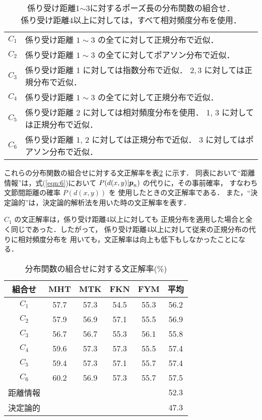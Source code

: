 \begin{table}
\begin{center}
\caption{係り受け距離1$\sim$3に対するポーズ長の分布関数の組合せ．\\
係り受け距離4以上に対しては，すべて相対頻度分布を使用．}
\label{cond:2}
\small
\begin{tabular}{cl}
\hline
\hline
$C_1$& 係り受け距離 $1\sim3$ の全てに対して正規分布で近似．\\
$C_2$& 係り受け距離 $1\sim3$ の全てに対してポアソン分布で近似．\\
$C_3$& 係り受け距離 1 に対しては指数分布で近似．
 $2, 3$ に対しては正規分布で近似．\\
\hline
$C_4$& 係り受け距離 $1\sim3$ の全てに対して正規分布で近似．\\
$C_5$& 係り受け距離 2 に対しては相対頻度分布を使用．
 1, 3 に対しては正規分布で近似．\\
$C_6$& 係り受け距離 1, 2 に対しては正規分布で近似．
 3 に対してはポアソン分布で近似．\\
\hline
\hline
\end{tabular}
\normalsize
\end{center}
\end{table}


これらの分布関数の組合せに対する文正解率を表\ref{res:3} に示す．
同表において``距離情報''は，式(\ref{eqn:6})において
$P(d(x,y)|\mbox{\boldmath$p$}_n)$ の代りに，その事前確率，
すなわち文節間距離の確率 $P(d(x,y))$ を
使用したときの文正解率である．
また，``決定論的''は，決定論的解析法を用いた時の文正解率を表す．

$C_{1}$ の文正解率は，係り受け距離4以上に対しても
正規分布を適用した場合と全く同じであった．したがって，
係り受け距離4以上に対して従来の正規分布の代りに相対頻度分布を
用いても，文正解率は向上も低下もしなかったことになる．

\begin{table}[htbp]
\begin{center}
\caption{分布関数の組合せに対する文正解率(\%)}
\label{res:3}
\small
\begin{tabular}{|c|c|c|c|c|c|}
\hline
組合せ	&MHT	&MTK	&FKN	&FYM	&平均\\
\hline
\hline
$C_1$   &57.7   &57.3   &54.5   &55.3   &56.2\\
$C_2$   &57.9   &56.9   &57.1   &55.5   &56.9\\
$C_3$   &56.7   &56.7   &55.3   &56.1   &55.8\\
\hline
$C_4$   &59.6   &57.3   &57.3   &55.5   &57.4\\
$C_5$   &59.4   &57.3   &57.1   &55.7   &57.4\\
$C_6$   &60.2   &56.9   &57.3   &55.7   &57.5\\
\hline
距離情報&	&	&	&	&52.3\\
\hline
決定論的&	&	&	&	&47.3\\
\hline
\end{tabular}
\normalsize
\end{center}
\end{table}

